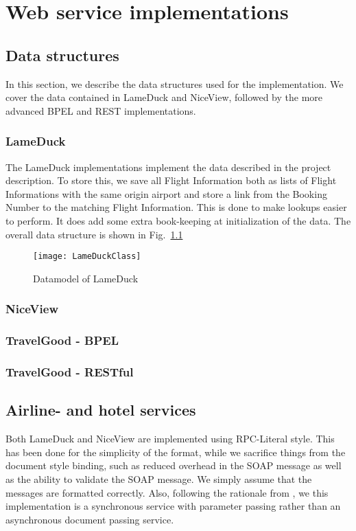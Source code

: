 {\setlength{\chapterfontsize}{23pt}
\chapter{Web service implementations}
}

\section{Data structures}
In this section, we describe the data structures used for the implementation. We cover the data contained in LameDuck and NiceView, followed by the more advanced BPEL and REST implementations.

\subsection{LameDuck}
The LameDuck implementations implement the data described in the project description. To store this, we save all Flight Information both as lists of Flight Informations with the same origin airport and store a link from the Booking Number to the matching Flight Information. This is done to make lookups easier to perform. It does add some extra book-keeping at initialization of the data. The overall data structure is shown in Fig.~\ref{fig:lameduck_class}

\begin{figure}[htb]
\centering
\texttt{[image: LameDuckClass]}
\caption{Datamodel of LameDuck}
\label{fig:lameduck_class}
\end{figure}

\subsection{NiceView}

\subsection{TravelGood - BPEL}

\subsection{TravelGood - RESTful}

\section{Airline- and hotel services}
Both LameDuck and NiceView are implemented using RPC-Literal style. This has been done for the simplicity of the format, while we sacrifice things from the document style binding, such as reduced overhead in the SOAP message as well as the ability to validate the SOAP message. We simply assume that the messages are formatted correctly.
Also, following the rationale from \cite{papazoglou2008web}, we this implementation is a synchronous service with parameter passing rather than an asynchronous document passing service.


